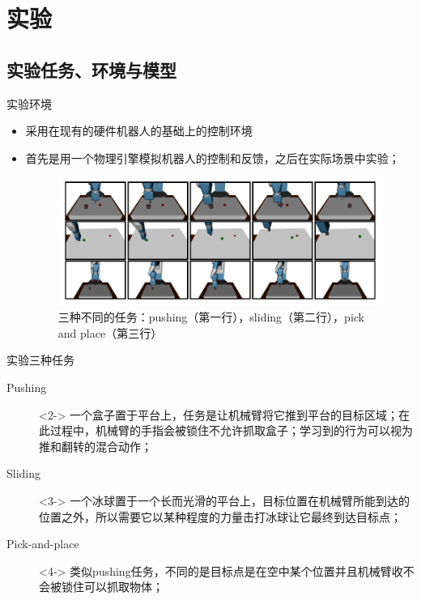 \documentclass[10pt]{beamer}
\begin{document}
	\section{实验}
	
	\subsection{实验任务、环境与模型}
	
	\begin{frame}{实验}{环境}
		\begin{itemize}
			\item 采用在现有的硬件机器人的基础上的控制环境
			\item 首先是用一个物理引擎模拟机器人的控制和反馈，之后在实际场景中实验；
				\begin{figure}
					\centering
					\includegraphics[width=0.8\linewidth]{pictures/her-robot}
					\caption{三种不同的任务：pushing（第一行），sliding（第二行），pick and place（第三行）}
					\label{fig:her-robot}
				\end{figure}
				
		\end{itemize}
	\end{frame}

	\begin{frame}{实验}{三种任务}
		\begin{description}
			\item[Pushing]<2-> 一个盒子置于平台上，任务是让机械臂将它推到平台的目标区域；在此过程中，机械臂的手指会被锁住不允许抓取盒子；学习到的行为可以视为推和翻转的混合动作；
			
			\item[Sliding]<3-> 一个冰球置于一个长而光滑的平台上，目标位置在机械臂所能到达的位置之外，所以需要它以某种程度的力量击打冰球让它最终到达目标点；
			
			\item[Pick-and-place]<4-> 类似pushing任务，不同的是目标点是在空中某个位置并且机械臂收不会被锁住可以抓取物体；
			
		\end{description}
	\end{frame}
\end{document}
